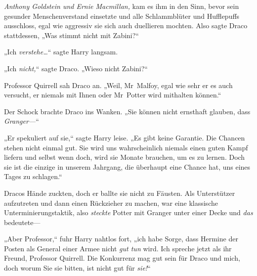 \emph{Anthony Goldstein und Ernie Macmillan,} kam es ihm in den Sinn, bevor sein gesunder Menschenverstand einsetzte und alle Schlammblüter und Hufflepuffs ausschloss, egal wie aggressiv sie sich auch duellieren mochten. Also sagte Draco stattdessen, „Was stimmt nicht mit Zabini?“

„Ich \emph{verstehe…}“ sagte Harry langsam.

„Ich \emph{nicht,}“ sagte Draco. „Wieso nicht Zabini?“

Professor Quirrell sah Draco an. „Weil, Mr~Malfoy, egal wie sehr er es auch versucht, er niemals mit Ihnen oder Mr~Potter wird mithalten können.“

Der Schock brachte Draco ins Wanken. „Sie können nicht ernsthaft glauben, dass \emph{Granger—}“

„Er spekuliert auf sie,“ sagte Harry leise. „Es gibt keine Garantie. Die Chancen stehen nicht einmal gut. Sie wird uns wahrscheinlich niemals einen guten Kampf liefern und selbst wenn doch, wird sie Monate brauchen, um es zu lernen. Doch sie ist die einzige in unserem Jahrgang, die überhaupt eine Chance hat, uns eines Tages zu schlagen.“

Dracos Hände zuckten, doch er ballte sie nicht zu Fäusten. Als Unterstützer aufzutreten und dann einen Rückzieher zu machen, war eine klassische Unterminierungstaktik, also \emph{steckte} Potter mit Granger unter einer Decke und \emph{das} bedeutete—

„Aber Professor,“ fuhr Harry nahtlos fort, „ich habe Sorge, dass Hermine der Posten als General einer Armee nicht \emph{gut tun} wird. Ich spreche jetzt als ihr Freund, Professor Quirrell. Die Konkurrenz mag gut sein für Draco und mich, doch worum Sie sie bitten, ist nicht gut für \emph{sie!}“

